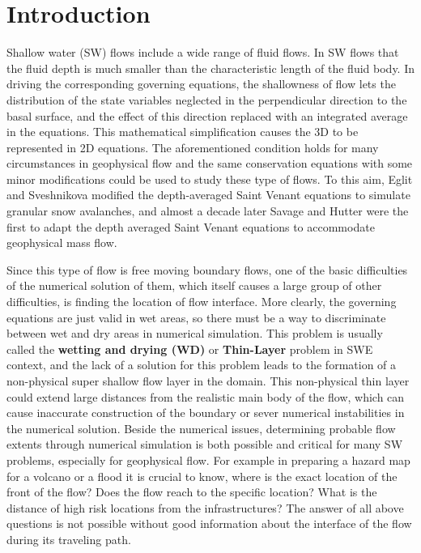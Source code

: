 \documentclass[letterpaper,10pt]{article}
\begin{document}
\section{Introduction} \label{introduction}

Shallow water (SW) flows include a wide range of fluid flows. In SW flows that the fluid depth is much 
smaller than the characteristic length of the fluid body. In driving the corresponding 
governing equations, the shallowness of flow lets the distribution of the state variables 
neglected in the perpendicular direction to the basal surface, and the effect of 
this direction replaced with an integrated average in the equations. 
This mathematical simplification causes the 3D to be represented in 2D equations.
The aforementioned condition holds for many circumstances in geophysical flow and the same 
conservation equations with some minor modifications could be used to study these type of flows. \newline
To this aim, Eglit and Sveshnikova \cite{eglit1980mms} modified the depth-averaged Saint Venant equations 
to simulate granular snow avalanches, and almost a decade later Savage and Hutter\cite{SavageHutter1989} 
were the first to adapt the depth averaged Saint Venant equations to accommodate  geophysical mass flow. 

Since this type of flow is free moving boundary flows, one of the basic difficulties 
of the numerical solution of them, which itself 
causes a large group of other difficulties, is finding the location of flow interface. 
More clearly, the governing equations are just valid in wet areas, so there must be a way to discriminate 
between wet and dry areas in numerical simulation. 
This problem is usually called the {\bf wetting and drying (WD)} or {\bf Thin-Layer} problem in SWE context, 
and the lack of a solution for this problem leads to the formation of a non-physical super shallow 
flow layer in the domain.
This non-physical thin layer could extend large distances from the realistic main 
body of the flow, which can cause inaccurate construction of the boundary or sever 
numerical instabilities in the numerical solution.\newline
Beside the numerical issues, determining probable flow extents through numerical simulation is both 
possible and critical for many SW problems, especially for geophysical flow. For example in preparing 
a hazard map for a volcano or a flood it is crucial to know, where is the exact location of the front of the
flow? Does the flow reach to the specific location? What is the distance of high risk locations from  
the infrastructures? \newline
The answer of all above questions is not possible without good information about the interface of 
the flow during its traveling path.\newline
\end{document}
